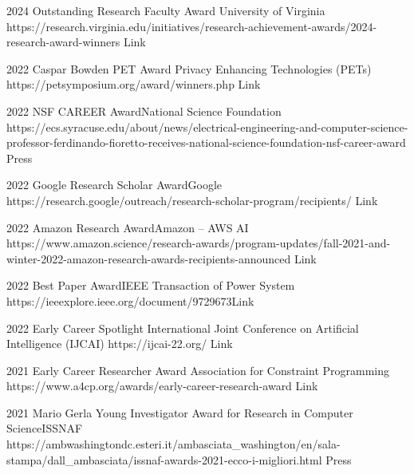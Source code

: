 \documentclass[localFont,alternative]{documentMETADATA}
\begin{document}
\vspace{-6pt}
\vspace{-6pt}

\begin{awards}
	\awardentry
	{2024}
	{Outstanding Research Faculty Award}
	{University of Virginia}%
	{https://research.virginia.edu/initiatives/research-achievement-awards/2024-research-award-winners}
	{Link}

	\awardentry
	{2022}
	{Caspar Bowden PET Award}%
	{Privacy Enhancing Technologies (PETs)}
	{https://petsymposium.org/award/winners.php}
	{Link}

	\awardentry
	{2022}
	{NSF CAREER Award}{National Science Foundation}
	{https://ecs.syracuse.edu/about/news/electrical-engineering-and-computer-science-professor-ferdinando-fioretto-receives-national-science-foundation-nsf-career-award}
	{Press}

	\awardentry
	{2022}
	{Google Research Scholar Award}{Google}
	{https://research.google/outreach/research-scholar-program/recipients/}
	{Link}

	\awardentry
	{2022}
	{Amazon Research Award}{Amazon -- AWS AI}
	{https://www.amazon.science/research-awards/program-updates/fall-2021-and-winter-2022-amazon-research-awards-recipients-announced}
	{Link}

	\awardentry
	{2022}
	{Best Paper Award}{IEEE Transaction of Power System}
	{https://ieeexplore.ieee.org/document/9729673}{Link}

	\awardentry
	{2022}
	{Early Career Spotlight}%
	{International Joint Conference on Artificial Intelligence (IJCAI)}
	{https://ijcai-22.org/}
	{Link}

	\awardentry
	{2021}
	{Early Career Researcher Award}
	{Association for Constraint Programming}
	{https://www.a4cp.org/awards/early-career-research-award}
	{Link}

	\awardentry
	{2021}
	{Mario Gerla Young Investigator Award for Research in Computer Science}{ISSNAF}
	{https://ambwashingtondc.esteri.it/ambasciata_washington/en/sala-stampa/dall_ambasciata/issnaf-awards-2021-ecco-i-migliori.html}
	{Press}


\end{awards}
\end{document}

